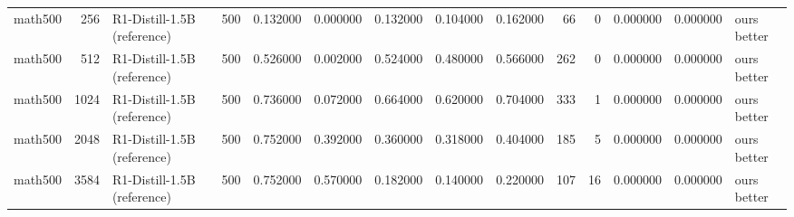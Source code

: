 \begin{table}
\begin{tabular}{lrlrrrrrrrrrrl}
math500 & 256 & R1-Distill-1.5B (reference) & 500 & 0.132000 & 0.000000 & 0.132000 & 0.104000 & 0.162000 & 66 & 0 & 0.000000 & 0.000000 & ours better \\
math500 & 512 & R1-Distill-1.5B (reference) & 500 & 0.526000 & 0.002000 & 0.524000 & 0.480000 & 0.566000 & 262 & 0 & 0.000000 & 0.000000 & ours better \\
math500 & 1024 & R1-Distill-1.5B (reference) & 500 & 0.736000 & 0.072000 & 0.664000 & 0.620000 & 0.704000 & 333 & 1 & 0.000000 & 0.000000 & ours better \\
math500 & 2048 & R1-Distill-1.5B (reference) & 500 & 0.752000 & 0.392000 & 0.360000 & 0.318000 & 0.404000 & 185 & 5 & 0.000000 & 0.000000 & ours better \\
math500 & 3584 & R1-Distill-1.5B (reference) & 500 & 0.752000 & 0.570000 & 0.182000 & 0.140000 & 0.220000 & 107 & 16 & 0.000000 & 0.000000 & ours better \\
\bottomrule
\end{tabular}
\end{table}
